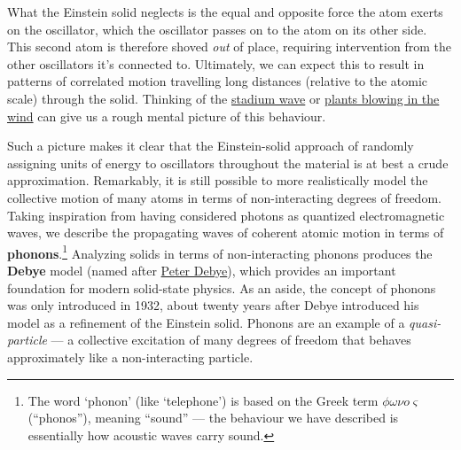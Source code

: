 \documentclass[12 pt]{article} %
\newcommand{\om}{\ensuremath{\omega} }
\begin{document}
What the Einstein solid neglects is the equal and opposite force the atom exerts on the oscillator, which the oscillator passes on to the atom on its other side.
This second atom is therefore shoved \textit{out} of place, requiring intervention from the other oscillators it's connected to.
Ultimately, we can expect this to result in patterns of correlated motion travelling long distances (relative to the atomic scale) through the solid.
Thinking of the \href{https://en.wikipedia.org/wiki/Wave_(audience)}{stadium wave} or \href{https://www.youtube.com/watch?v=uTlwzsud-zg}{plants blowing in the wind} can give us a rough mental picture of this behaviour.

Such a picture makes it clear that the Einstein-solid approach of randomly assigning units of energy to oscillators throughout the material is at best a crude approximation.
Remarkably, it is still possible to more realistically model the collective motion of many atoms in terms of non-interacting degrees of freedom.
Taking inspiration from having considered photons as quantized electromagnetic waves, we describe the propagating waves of coherent atomic motion in terms of \textbf{phonons}.\footnote{The word `phonon' (like `telephone') is based on the Greek term $\phi \om \nu o \varsigma$ (``phonos''), meaning ``sound'' --- the behaviour we have described is essentially how acoustic waves carry sound.}
Analyzing solids in terms of non-interacting phonons produces the \textbf{Debye} model (named after \href{https://en.wikipedia.org/wiki/Peter_Debye}{Peter Debye}), which provides an important foundation for modern solid-state physics.
As an aside, the concept of phonons was only introduced in 1932, about twenty years after Debye introduced his model as a refinement of the Einstein solid.
Phonons are an example of a \textit{quasi-particle} --- a collective excitation of many degrees of freedom that behaves approximately like a non-interacting particle.
\end{document}

